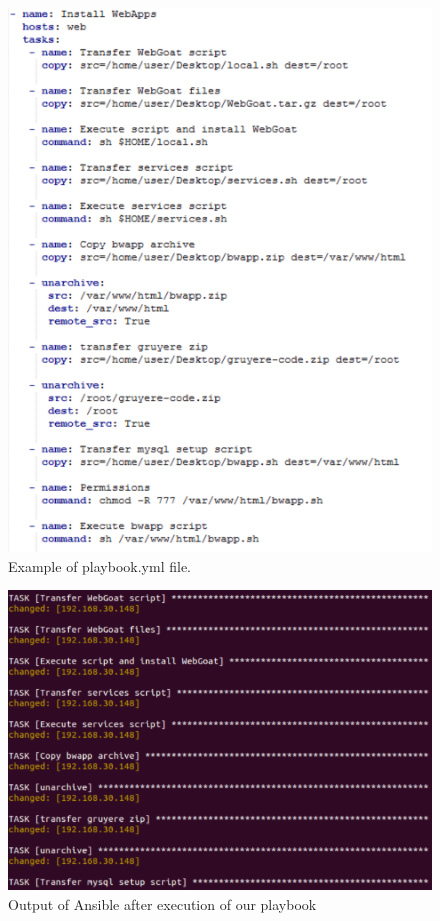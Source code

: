\documentclass[12pt, a4paper]{article}
\begin{document}
\begin{figure}[H]
\includegraphics[width=1.0\textwidth]{playbook.png}
\caption{Example of playbook.yml file.}
\end{figure}

\begin{figure}[H]
\includegraphics[width=1.0\textwidth]{playbookOutput.png}
\caption{Output of Ansible after execution of our playbook}
\end{figure}
\end{document}
